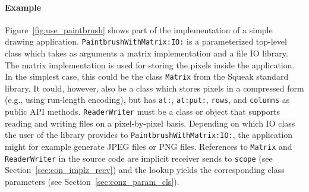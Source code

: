 \paragraph{Example}
Figure~\ref{fig:use_paintbrush} shows part of the implementation of a simple drawing application. \texttt{PaintbrushWithMatrix:IO:} is a parameterized top-level class which takes as arguments a matrix implementation and a file IO library. The matrix implementation is used for storing the pixels inside the application. In the simplest case, this could be the class \texttt{Matrix} from the Squeak standard library. It could, however, also be a class which stores pixels in a compressed form (e.g., using run-length encoding), but has \texttt{at:}, \texttt{at:put:}, \texttt{rows}, and \texttt{columns} as public API methods. \texttt{ReaderWriter} must be a class or object that supports reading and writing files on a pixel-by-pixel basis. Depending on which IO class the user of the library provides to \texttt{PaintbrushWithMatrix:IO:}, the application might for example generate JPEG files or PNG files. References to \texttt{Matrix} and \texttt{ReaderWriter} in the source code are implicit receiver sends to \texttt{scope} (see Section~\ref{sec:con_implz_recv}) and the lookup yields the corresponding class parameters (see Section~\ref{sec:conz_param_cls}).

